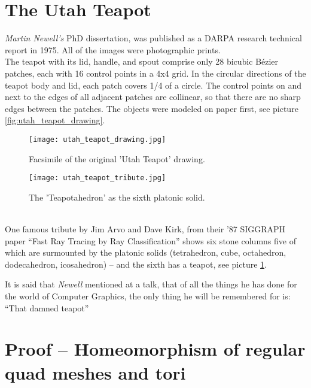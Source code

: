 \newpage
\vspace*{1ex}
\section{The Utah Teapot}
\label{appendix3}

\textit{Martin Newell's} PhD dissertation, was published as a DARPA research technical report in 1975. 
All of the images were photographic prints.\\
The teapot with its lid, handle, and spout comprise only 28 bicubic Bézier patches, each with 16 control points in a 4x4 grid.
In the circular directions of the teapot body and lid, each patch covers 1/4 of a circle. The control points on and next to the edges of all adjacent patches are collinear, so that there are no sharp edges between the patches. 
The objects were modeled on paper first, see picture \ref{fig:utah_teapot_drawing}.
\begin{figure}[ht]
\begin{minipage}[b]{0.45\linewidth} \centering
\texttt{[image: utah\_teapot\_drawing.jpg]}
\caption{Facsimile of the original 'Utah Teapot' drawing.}
\label{fig:utah_teapot_drawing}
\end{minipage}
\hspace{0.25cm}
\begin{minipage}[b]{0.45\linewidth}
\centering
\texttt{[image: utah\_teapot\_tribute.jpg]}
\caption{The 'Teapotahedron' as the sixth platonic solid.}
\label{fig:utah_teapot_tribute}
\end{minipage}
\end{figure}\\
One famous tribute by Jim Arvo and Dave Kirk, from their '87 SIGGRAPH paper ``Fast Ray Tracing by Ray Classification'' shows six stone columns five of which are surmounted by the platonic solids (tetrahedron, cube, octahedron, dodecahedron, icosahedron) -- and the sixth has a teapot, see picture \ref{fig:utah_teapot_tribute}.

It is said that \textit{Newell} mentioned at a talk, that of all the things he has done for the world of Computer Graphics, the only thing he will be remembered for is: ``That damned teapot'' \citep[cf.][Copyright Computer History Museum]{Newell1975b}

\newpage
\vspace*{1ex}
\section{Proof -- Homeomorphism of regular quad meshes and tori}
\label{appendix4}


